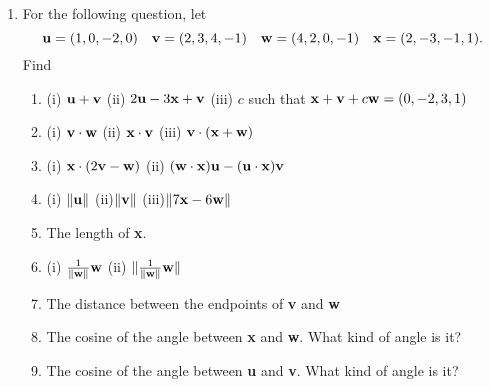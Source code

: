 \begin{enumerate}
\item For the following question, let
$$ {\bf u}=(1,0,-2,0) \quad {\bf v}=(2,3,4,-1)  \quad {\bf
w}=(4,2,0,-1) \quad {\bf x}=(2,-3,-1,1). $$ Find
\begin{enumerate}
\item (i) ${\bf u}+{\bf v}$ \quad (ii) $2{\bf u}-3{\bf x}+{\bf v}$
\quad (iii) $c$ such that ${\bf x}+{\bf v}+c{\bf w}=(0,-2,3,1)$
\item (i) ${\bf v}\cdot {\bf w}$ \quad (ii) ${\bf x}\cdot {\bf v}$
\quad (iii) ${\bf v}\cdot({\bf x}+{\bf w}) $
\item (i) ${\bf x} \cdot (2{\bf v}-{\bf w})$ \quad (ii)
$({\bf w}\cdot {\bf x}){\bf u}-({\bf u}\cdot {\bf x}){\bf v}$
\item (i) $\| {\bf u} \|$ \quad (ii)$ \|{\bf v} \|$ \quad (iii)$\| 7{\bf x}-6{\bf w}\| $
\item The length of {\bf x}.
\item (i) $\frac{1}{\|{\bf w}\|}{\bf w}$ \quad (ii) $ \| \frac{1}{\|{\bf w}\|}{\bf w}\|$
\item The distance between the endpoints of {\bf v} and {\bf w}
\item The cosine of the angle between {\bf x} and {\bf w}. What
kind of angle is it?
\item The cosine of the angle between {\bf u} and {\bf v}. What
kind of angle is it?
\end{enumerate}
\end{enumerate}
